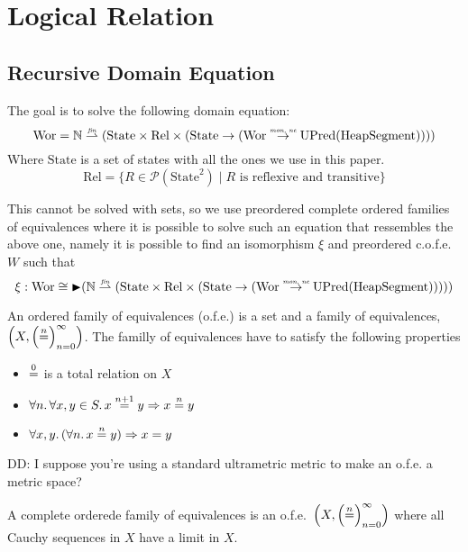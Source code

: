 \documentclass{article}
\newcommand{\finparfun}{\stackrel{\textit{\tiny{fin}}}{\rightharpoonup}}
\newcommand{\monnefun}{\stackrel{\textit{\tiny{mon, ne}}}{\rightarrow}}
\newcommand{\fun}{\rightarrow}
\newcommand{\nequal}[1][n]{\stackrel{\tiny{#1}}{=}}
\newcommand{\blater}{\mathop{\blacktriangleright}}
\newcommand{\powerset}[1]{\mathcal{P}(#1)}
\newcommand{\cofe}{c.o.f.e.}
\newcommand{\cofes}{\cofe{}'s}
\newcommand\dominique[1]{{\color{purple} \sf \footnotesize {DD: #1}}\\}
\newcommand{\plaindom}[1]{\mathrm{#1}}
\newcommand{\HeapSegments}{\plaindom{HeapSegment}}
\newcommand{\nats}{\mathbb{N}}
\newcommand{\Rel}{\plaindom{Rel}}
\newcommand{\States}{\plaindom{State}}
\newcommand{\Wor}{\plaindom{Wor}}
\newcommand{\UPred}[1]{\plaindom{UPred}(#1)}
\begin{document}
\section{Logical Relation}
\label{sec:logical-relation}
\subsection{Recursive Domain Equation}
\label{subsec:recursive-dom-eq}
The goal is to solve the following domain equation:
\[
\Wor = \nats \finparfun (\States \times \Rel \times (\States \fun (\Wor \monnefun \UPred{\HeapSegments})))
\]
Where $\States$ is a set of states with all the ones we use in this paper.
\[
\Rel= \{R \in \powerset{\States^2} \mid R \text{ is reflexive and transitive} \}
\]

This cannot be solved with sets, so we use preordered complete ordered families of equivalences where it is possible to solve such an equation that ressembles the above one, namely it is possible to find an isomorphism $\xi$ and preordered \cofe{} $W$ such that
\[
  \xi : \Wor \cong \blater (\nats \finparfun (\States \times \Rel \times (\States \fun (\Wor \monnefun \UPred{\HeapSegments}))))
\]

\begin{definition}[o.f.e's]
  An ordered family of equivalences (o.f.e.) is a set and a family of equivalences, $\left(X, \left(\nequal\right)_{n=0}^{\infty} \right)$. The familly of equivalences have to satisfy the following properties
  \begin{itemize}
  \item $\nequal[0]$ is a total relation on $X$
  \item $\forall n \ldotp \forall x,y \in S \ldotp x \nequal[n+1] y \Rightarrow x \nequal y$
  \item $\forall x,y \ldotp(\forall n \ldotp x \nequal y) \Rightarrow x=y$
  \end{itemize}
\end{definition}

\dominique{I suppose you're using a standard ultrametric metric to make an
  o.f.e. a metric space?}
\begin{definition}[\cofes]
  A complete orderede family of equivalences is an o.f.e.\ $\left(X, \left(\nequal\right)_{n=0}^{\infty} \right)$ where all Cauchy sequences in $X$ have a limit in $X$.
\end{definition}
\end{document}
